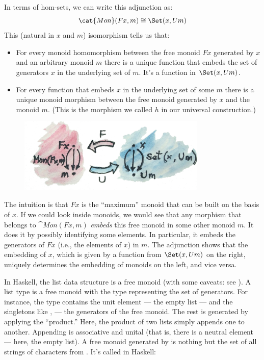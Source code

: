 \noindent
In terms of hom-sets, we can write this adjunction as:
\[\cat{Mon}(F x, m) \cong \Set(x, U m)\]
This (natural in $x$ and $m$) isomorphism tells us that:

\begin{itemize}
\tightlist
\item
  For every monoid homomorphism between the free monoid $F x$
  generated by $x$ and an arbitrary monoid $m$ there is a
  unique function that embeds the set of generators $x$ in the
  underlying set of $m$. It's a function in
  $\Set(x, U m)$.
\item
  For every function that embeds $x$ in the underlying set of
  some $m$ there is a unique monoid morphism between the free
  monoid generated by $x$ and the monoid $m$. (This is the
  morphism we called $h$ in our universal construction.)
\end{itemize}

\begin{figure}[H]
\centering
\includegraphics[width=0.8\textwidth]{images/freemonadjunction.jpg}
\end{figure}

\noindent
The intuition is that $F x$ is the ``maximum'' monoid that can
be built on the basis of $x$. If we could look inside monoids, we
would see that any morphism that belongs to $\cat{Mon}(F x, m)$
\emph{embeds} this free monoid in some other monoid $m$. It does
it by possibly identifying some elements. In particular, it embeds the
generators of $F x$ (i.e., the elements of $x$) in
$m$. The adjunction shows that the embedding of $x$, which
is given by a function from $\Set(x, U m)$ on the right,
uniquely determines the embedding of monoids on the left, and vice
versa.

In Haskell, the list data structure is a free monoid (with some caveats:
see ). A list type \code{{[}a{]}} is a free monoid with
the type  representing the set of generators. For instance,
the type \code{{[}Char{]}} contains the unit element --- the empty
list \code{{[}{]}} --- and the singletons like
\code{{[}'a'{]}}, \code{{[}'b'{]}} --- the
generators of the free monoid. The rest is generated by applying the
``product.'' Here, the product of two lists simply appends one to
another. Appending is associative and unital (that is, there is a
neutral element --- here, the empty list). A free monoid generated by
 is nothing but the set of all strings of characters from
. It's called  in Haskell:


